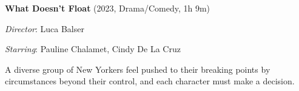 \textbf{What Doesn't Float} (2023, Drama/Comedy, 1h 9m)

\textit{Director}: Luca Balser

\textit{Starring}: Pauline Chalamet, Cindy De La Cruz

A diverse group of New Yorkers feel pushed to their breaking points by circumstances beyond their control, and each character must make a decision.